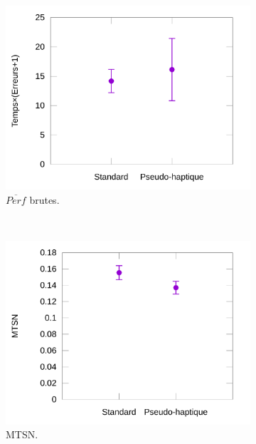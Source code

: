\begin{figure}[htbp]
\begin{subfigure}[t]{0.49\textwidth}
			\includegraphics[width=\textwidth]{figures/ch5/phRawProducts}
			\caption{$\overline{Perf}$ brutes.}
			\label{fig:phRawProducts}
		\end{subfigure}
		~
		\begin{subfigure}[t]{0.49\textwidth}
			\centering
			\includegraphics[width=\textwidth]{figures/ch5/phNormTimes}
			\caption{MTSN.}
			\label{fig:phNormTimes}
		\end{subfigure}
				~
		\begin{subfigure}[t]{0.49\textwidth}
			\centering

\end{subfigure}
\end{figure}

